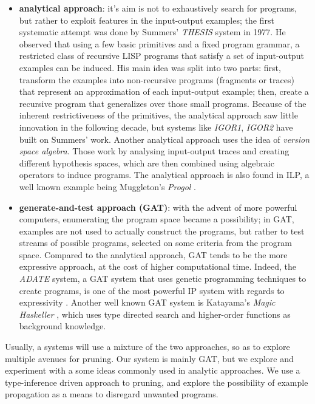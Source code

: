 \begin{itemize}
\item \textbf{analytical approach}: it's aim is not to exhaustively search for programs, but rather to exploit features in the input-output examples; the first systematic attempt was done by Summers' \textit{THESIS} \cite{thesis} system in 1977. He observed that using a few basic primitives and a fixed program grammar, a restricted class of recursive LISP programs that satisfy a set of input-output examples can be induced. His main idea was split into two parts: first, transform the examples into non-recursive programs (fragments or traces) that represent an approximation of each input-output example; then, create a recursive program that generalizes over those small programs. Because of the inherent restrictiveness of the primitives, the analytical approach saw little innovation in the following decade, but systems like \textit{IGOR1}, \textit{IGOR2} \cite{igor2} have built on Summers' work. Another analytical approach uses the idea of \textit{version space algebra}. Those work by analysing input-output traces and creating different hypothesis spaces, which are then combined using algebraic operators to induce programs. The analytical approach is also found in ILP, a well known example being Muggleton's \textit{Progol} \cite{progol}.
\item \textbf{generate-and-test approach (GAT)}: with the advent of more powerful computers, enumerating the program space became a possibility; in GAT, examples are not used to actually construct the programs, but rather to test streams of possible programs, selected on some criteria from the program space. Compared to the analytical approach, GAT tends to be the more expressive approach, at the cost of higher computational time. Indeed, the \textit{ADATE} system, a GAT system that uses genetic programming techniques to create programs, is one of the most powerful IP system with regards to expressivity \cite{kitzelmannsurvey}. Another well known GAT system is Katayama's \textit{Magic Haskeller} \cite{mhask}, which uses type directed search and higher-order functions as background knowledge.
\end{itemize}
\indent \indent Usually, a systems will use a mixture of the two approaches, so as to explore multiple avenues for pruning. Our system is mainly GAT, but we explore and experiment with a some ideas commonly used in analytic approaches. We use a type-inference driven approach to pruning, and explore the possibility of example propagation as a means to disregard unwanted programs.


